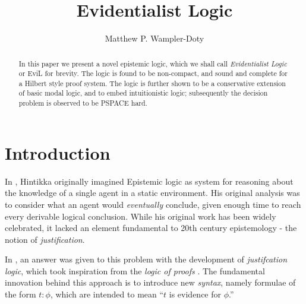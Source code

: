 \documentclass[11pt]{article}
\title{Evidentialist Logic}
\author{Matthew P. Wampler-Doty}
\date{}                                           %
\begin{document}
\maketitle
\begin{abstract} In this paper we present a novel epistemic logic, which we shall call \emph{Evidentialist Logic} or \textsf{EviL} for brevity.  The logic is found to be non-compact, and sound and complete for a Hilbert style proof system.  The logic is further shown to be a conservative extension of basic modal logic, and to embed intuitionistic logic; subsequently the decision problem is observed to be \textsf{PSPACE} hard.  
\end{abstract}

\section{Introduction}

In \cite{hintikka1962kab}, Hintikka originally imagined Epistemic logic as system for reasoning about the knowledge of a single agent in a static environment.  His original analysis was to consider what an agent would \emph{eventually} conclude, given enough time to reach every derivable logical conclusion.  While his original work has been widely celebrated, it lacked an element fundamental to 20th century epistemology - the notion of \emph{justification}.

In \cite{artemov2005iji}, an answer was given to this problem with the development of \emph{justifcation logic}, which took inspiration from the \emph{logic of proofs} \citep{artemov1994lp}.  The fundamental innovation behind this approach is to introduce new \emph{syntax}, namely formulae of the form $t: \phi$, which are intended to mean ``$t$ is evidence for $\phi$.''
\end{document}
